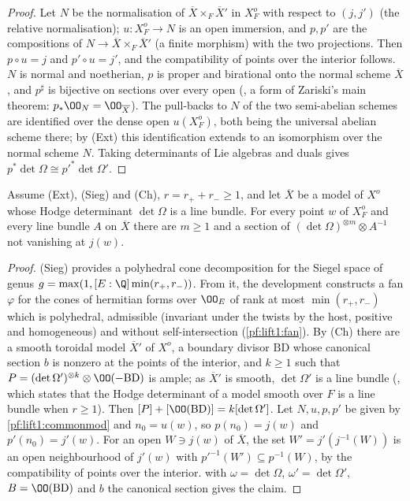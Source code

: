 \begin{proof}
Let $N$ be the normalisation of $\overline X\times_F\overline X'$ in $X^o_F$ with respect to $(j,j')$
(the relative normalisation); $u\colon X^o_F\to N$ is an open immersion, and $p,p'$ are the compositions
of $N\to\overline X\times_F\overline X'$ (a finite morphism) with the two projections. Then $p\circ u=j$
and $p'\circ u=j'$, and the compatibility of points over the interior follows. $N$ is normal and
noetherian, $p$ is proper and birational onto the normal scheme $\overline X$, and $p^\sharp$ is
bijective on sections over every open (, a form of
Zariski's main theorem: $p_*\OO_N=\OO_{\overline X}$). The pull-backs to $N$ of the two semi-abelian
schemes are identified over the dense open $u(X^o_F)$, both being the universal abelian scheme there; by
(Ext) this identification extends to an isomorphism over the normal scheme $N$. Taking determinants of
Lie algebras and duals gives $p^*\det\Omega\cong p'^*\det\Omega'$.
\end{proof}

\begin{proposition}\label{pf:lift1:secdet}
Assume (Ext), (Sieg) and (Ch), $r=r_++r_-\ge1$, and let $\overline X$ be a model of $X^o$ whose Hodge
determinant $\det\Omega$ is a line bundle. For every point $w$ of $X^o_F$ and every line bundle $A$ on
$\overline X$ there are $m\ge1$ and a section of $(\det\Omega)^{\otimes m}\otimes A^{-1}$ not vanishing at
$j(w)$.
\end{proposition}

\begin{proof}
(Sieg) provides a polyhedral cone decomposition for the Siegel space of genus
$g=\max(1,[E:\Q]\min(r_+,r_-))$. From it, the development constructs a fan $\varphi$ for the cones of
hermitian forms over $\OO_E$ of rank at most $\min(r_+,r_-)$ which is polyhedral, admissible (invariant
under the twists by the host, positive and homogeneous) and without self-intersection
(\cref{pf:lift1:fan}). By (Ch) there are a smooth toroidal model $\overline X'$ of $X^o$, a boundary
divisor $\mathrm{BD}$ whose canonical section $b$ is nonzero at the points of the interior, and $k\ge1$
such that $P=(\det\Omega')^{\otimes k}\otimes\OO(-\mathrm{BD})$ is ample; as $\overline X'$ is smooth,
$\det\Omega'$ is a line bundle (, which states that
the Hodge determinant of a model smooth over $F$ is a line bundle when $r\ge1$). Then
$[P]+[\OO(\mathrm{BD})]=k[\det\Omega']$. Let $N,u,p,p'$ be given by \cref{pf:lift1:commonmod} and
$n_0=u(w)$, so $p(n_0)=j(w)$ and $p'(n_0)=j'(w)$. For an open $W\ni j(w)$ of $\overline X$, the set
$W'=j'(j^{-1}(W))$ is an open neighbourhood of $j'(w)$ with $p'^{-1}(W')\subseteq p^{-1}(W)$, by the
compatibility of points over the interior.  with $\omega=\det\Omega$,
$\omega'=\det\Omega'$, $B=\OO(\mathrm{BD})$ and $b$ the canonical section gives the claim.
\end{proof}

